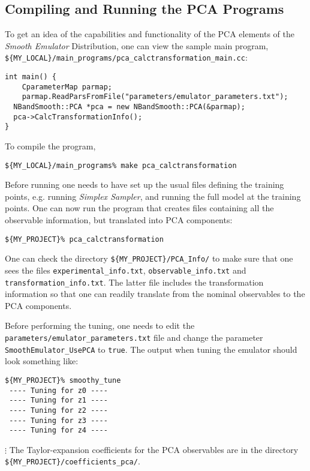 \documentclass[UserManual.tex]{subfiles}
\begin{document}
\subsection{Compiling and Running the PCA Programs}
To get an idea of the capabilities and functionality of the PCA elements of the {\it Smooth Emulator} Distribution, one can view the sample main program,\\
{\tt \$\{MY\_LOCAL\}/main\_programs/pca\_calctransformation\_main.cc}:
{\tt\begin{verbatim}
int main() {
	CparameterMap parmap;
	parmap.ReadParsFromFile("parameters/emulator_parameters.txt");
  NBandSmooth::PCA *pca = new NBandSmooth::PCA(&parmap);
  pca->CalcTransformationInfo();
}
\end{verbatim}}
To compile the program,
{\tt\begin{verbatim}
${MY_LOCAL}/main_programs% make pca_calctransformation
\end{verbatim}}
Before running one needs to have set up the usual files defining the training points, e.g. running {\it Simplex Sampler}, and running the full model at the training points. One can now run the program that creates files containing all the observable information, but translated into PCA components:
{\tt\begin{verbatim}
${MY_PROJECT}% pca_calctransformation
\end{verbatim}}
One can check the directory {\tt \$\{MY\_PROJECT\}/PCA\_Info/} to make sure that one sees the files {\tt experimental\_info.txt}, {\tt observable\_info.txt} and {\tt transformation\_info.txt}. The latter file includes the transformation information so that one can readily translate from the nominal observables to the PCA components.

Before performing the tuning, one needs to edit the {\tt parameters/emulator\_parameters.txt} file and change the parameter {\tt SmoothEmulator\_UsePCA} to {\tt true}. The output when tuning the emulator should look something like:
{\tt\begin{verbatim}
${MY_PROJECT}% smoothy_tune
 ---- Tuning for z0 ----
 ---- Tuning for z1 ----
 ---- Tuning for z2 ----
 ---- Tuning for z3 ----
 ---- Tuning for z4 ----
\end{verbatim}} \vspace*{-16pt}
\hspace*{352pt}$\vdots$
The Taylor-expansion coefficients for the PCA observables are in the directory {\tt \$\{MY\_PROJECT\}/coefficients\_pca/}. 
\end{document}
